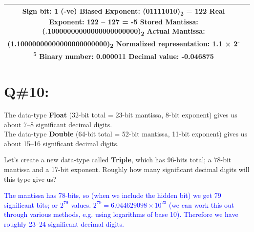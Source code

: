 {\begin{longtable}{|c|p{10cm}|}
Sign bit: 1 (-ve) \newline
Biased Exponent: (01111010)\textsubscript{2} = 122 \newline
Real Exponent: 122 – 127 = -5 \newline
Stored Mantissa: (.10000000000000000000000)\textsubscript{2} \newline
Actual Mantissa: (1.10000000000000000000000)\textsubscript{2} \newline
Normalized representation: 1.1 × 2\textsuperscript{-5} \newline
Binary number: 0.000011 \newline
Decimal value: \textbf{-0.046875} \\
\hline
\end{longtable}
}

\section*{Q\#10:}
The data-type \textbf{Float} (32-bit total = 23-bit mantissa, 8-bit exponent) gives us about 7–8 significant decimal digits. \\
The data-type \textbf{Double} (64-bit total = 52-bit mantissa, 11-bit exponent) gives us about 15–16 significant decimal digits.

\vspace{0.5em}
Let's create a new data-type called \textbf{Triple}, which has 96-bits total; a 78-bit mantissa and a 17-bit exponent. Roughly how many significant decimal digits will this type give us?

\textcolor{blue}{
The mantissa has 78-bits, so (when we include the hidden bit) we get 79 significant bits; or $2^{79}$ values.
$2^{79} = 6.044629098 \times 10^{23}$ 
(we can work this out through various methods, e.g. using logarithms of base 10). Therefore we have
roughly 23–24 significant decimal digits.
}